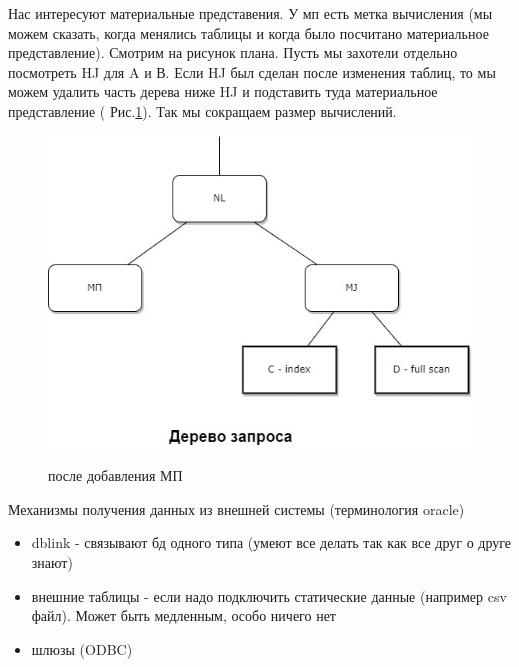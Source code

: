 Нас интересуют материальные представения. У мп есть метка вычисления (мы можем сказать, когда менялись таблицы и когда было посчитано материальное представление). Смотрим на рисунок плана. Пусть мы захотели отдельно посмотреть HJ для A и В. Если HJ был сделан после изменения таблиц, то мы можем удалить часть дерева ниже HJ и подставить туда материальное представление ( Рис.\ref{fig:plan2}). Так мы сокращаем размер вычислений.  

 \begin{figure}[h!]
     \centering
     \includegraphics[scale = 0.5]{5/plan2.jpg}
     \label{fig:plan2}
     \caption{после добавления МП}
 \end{figure}

Механизмы получения данных из внешней системы (терминология  oracle)
\begin{itemize}
    \item  dblink -  связывают бд одного типа (умеют все делать так как все друг о друге знают)
    \item внешние таблицы - если надо подключить статические данные (например csv файл). Может быть медленным, особо ничего нет
    \item шлюзы (ODBC) 
\end{itemize}
